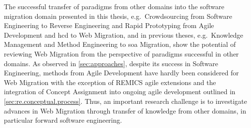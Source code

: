 The successful transfer of paradigms from other domains into the software migration domain presented in this thesis, e.g.~\gls{Crowdsourcing} from Software Engineering to \gls{Reverse Engineering} and \gls{Rapid Prototyping} from Agile Development and \gls{hcd} to \gls{Web Migration}, and in previous theses, e.g.~Knowledge Management \autocite{Razavian2013PHD} and Method Engineering \autocite{Khadka2016PHD} to \gls{soa} Migration, show the potential of reviewing \gls{Web Migration} from the perspective of paradigms successful in other domains.
As observed in \cref{sec:approaches}, despite its success in Software Engineering, methods from Agile Development have hardly been considered for \gls{Web Migration} with the exception of REMICS agile extensions \autocite{Krasteva2013REMICSAgile} and the integration of \gls{Concept Assignment} into ongoing agile development outlined in \cref{sec:re.conceptual.process}.
Thus, an important research challenge is to investigate advances in \gls{Web Migration} through transfer of knowledge from other domains, in particular forward software engineering.

